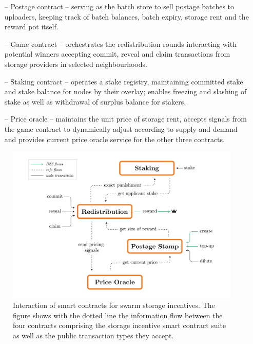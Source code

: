 \begin{itemize}
    \item[--] Postage contract -- serving as the batch store to sell postage batches to uploaders, keeping track of batch balances, batch expiry, storage rent and the reward pot itself.
    \item[--] Game contract -- orchestrates the redistribution rounds interacting with potential winners accepting commit, reveal and claim transactions from storage providers in selected neighbourhoods.
    \item[--] Staking contract -- operates a stake registry, maintaining committed stake and stake balance for nodes by their overlay; enables freezing and slashing of stake as well as withdrawal of surplus balance for stakers.
    \item[--] Price oracle -- maintains the unit price of  storage rent, accepts signals from the game contract to dynamically adjust according to supply and demand and provides current price oracle service for the other three contracts.
\end{itemize}


\begin{figure}[!ht]
  \centering
     \includegraphics[width=\textwidth]{fig/smart contract interaction.pdf}
  \caption[Interaction of smart contracts for swarm storage incentives]{Interaction of smart contracts for swarm storage incentives. The figure shows with the dotted line the information flow between the four contracts comprising the storage incentive smart contract suite as well as the public transaction types they accept. }
\label{fig:smart-contracts}
\end{figure}    

